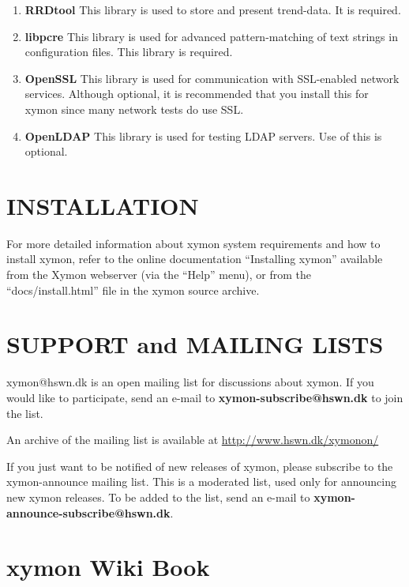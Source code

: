\begin{enumerate}

 \item \textbf{RRDtool}
 This library is used to store and present trend-data. It is required. 

 \item \textbf{libpcre}
 This library is used for advanced pattern-matching of text strings in
 configuration files. This library is required. 

 \item \textbf{OpenSSL}
 This library is used for communication with SSL-enabled network
 services. Although optional, it is recommended that you install this
 for xymon since many network tests do use SSL. 

 \item \textbf{OpenLDAP}
 This library is used for testing LDAP servers. Use of this is optional. 

\end{enumerate}

\section{INSTALLATION}
  For more detailed information about xymon system requirements and
  how to install xymon, refer to the online documentation
  ``Installing xymon'' available from the Xymon webserver (via the
  ``Help'' menu), or from the ``docs/install.html'' file in the xymon
  source archive. 


\section{SUPPORT and MAILING LISTS}
xymon@hswn.dk is an open mailing list for discussions about
xymon. If you would like to participate, send an e-mail to
\textbf{xymon-subscribe@hswn.dk} to join the list. 


An archive of the mailing list is available at \url{http://www.hswn.dk/xymonon/}


If you just want to be notified of new releases of xymon, please
subscribe to the xymon-announce mailing list. This is a moderated
list, used only for announcing new xymon releases. To be added to
the list, send an e-mail to \textbf{xymon-announce-subscribe@hswn.dk}. 

\section{xymon Wiki Book}

